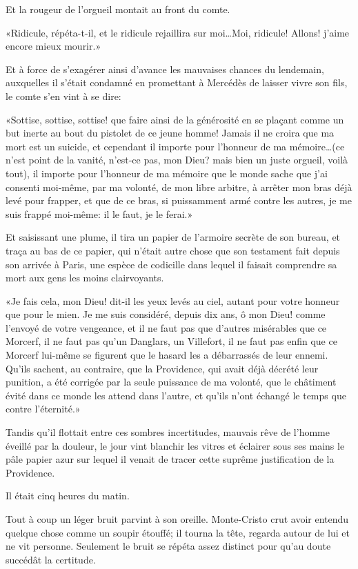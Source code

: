 Et la rougeur de l'orgueil montait au front du comte. 

«Ridicule, répéta-t-il, et le ridicule rejaillira sur moi\dots Moi, ridicule! Allons! j'aime encore mieux mourir.» 

Et à force de s'exagérer ainsi d'avance les mauvaises chances du lendemain, auxquelles il s'était condamné en promettant à Mercédès de laisser vivre son fils, le comte s'en vint à se dire: 

«Sottise, sottise, sottise! que faire ainsi de la générosité en se plaçant comme un but inerte au bout du pistolet de ce jeune homme! Jamais il ne croira que ma mort est un suicide, et cependant il importe pour l'honneur de ma mémoire\dots (ce n'est point de la vanité, n'est-ce pas, mon Dieu? mais bien un juste orgueil, voilà tout), il importe pour l'honneur de ma mémoire que le monde sache que j'ai consenti moi-même, par ma volonté, de mon libre arbitre, à arrêter mon bras déjà levé pour frapper, et que de ce bras, si puissamment armé contre les autres, je me suis frappé moi-même: il le faut, je le ferai.» 

Et saisissant une plume, il tira un papier de l'armoire secrète de son bureau, et traça au bas de ce papier, qui n'était autre chose que son testament fait depuis son arrivée à Paris, une espèce de codicille dans lequel il faisait comprendre sa mort aux gens les moins clairvoyants. 

«Je fais cela, mon Dieu! dit-il les yeux levés au ciel, autant pour votre honneur que pour le mien. Je me suis considéré, depuis dix ans, ô mon Dieu! comme l'envoyé de votre vengeance, et il ne faut pas que d'autres misérables que ce Morcerf, il ne faut pas qu'un Danglars, un Villefort, il ne faut pas enfin que ce Morcerf lui-même se figurent que le hasard les a débarrassés de leur ennemi. Qu'ils sachent, au contraire, que la Providence, qui avait déjà décrété leur punition, a été corrigée par la seule puissance de ma volonté, que le châtiment évité dans ce monde les attend dans l'autre, et qu'ils n'ont échangé le temps que contre l'éternité.» 

Tandis qu'il flottait entre ces sombres incertitudes, mauvais rêve de l'homme éveillé par la douleur, le jour vint blanchir les vitres et éclairer sous ses mains le pâle papier azur sur lequel il venait de tracer cette suprême justification de la Providence. 

Il était cinq heures du matin. 

Tout à coup un léger bruit parvint à son oreille. Monte-Cristo crut avoir entendu quelque chose comme un soupir étouffé; il tourna la tête, regarda autour de lui et ne vit personne. Seulement le bruit se répéta assez distinct pour qu'au doute succédât la certitude. 

